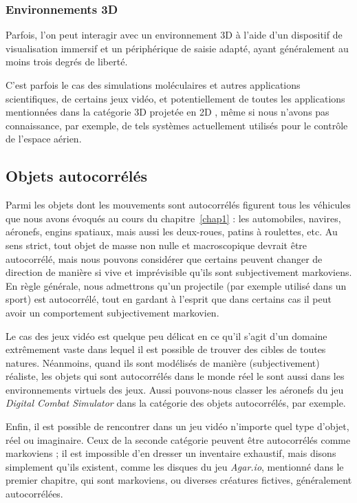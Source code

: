 	\subsubsection{Environnements 3D}
	Parfois, l'on peut interagir avec un environnement 3D à l'aide d'un dispositif de visualisation immersif et un périphérique de saisie adapté, ayant généralement au moins trois degrés de liberté.
	
	C'est parfois le cas des simulations moléculaires et autres applications scientifiques, de certains jeux vidéo, et potentiellement de toutes les applications mentionnées dans la catégorie \og 3D projetée en 2D \fg{}, même si nous n'avons pas connaissance, par exemple, de tels systèmes actuellement utilisés pour le contrôle de l'espace aérien.

	\subsection{Objets autocorrélés}
	Parmi les objets dont les mouvements sont autocorrélés figurent tous les véhicules que nous avons évoqués au cours du chapitre~\ref{chap1} : les automobiles, navires, aéronefs, engins spatiaux, mais aussi les deux-roues, patins à roulettes, etc. Au sens strict, tout objet de masse non nulle et macroscopique devrait être autocorrélé, mais nous pouvons considérer que certains peuvent changer de direction de manière si vive et imprévisible qu'ils sont subjectivement markoviens. En règle générale, nous admettrons qu'un projectile (par exemple utilisé dans un sport) est autocorrélé, tout en gardant à l'esprit que dans certains cas il peut avoir un comportement subjectivement markovien.
	
	Le cas des jeux vidéo est quelque peu délicat en ce qu'il s'agit d'un domaine extrêmement vaste dans lequel il est possible de trouver des cibles de toutes natures. Néanmoins, quand ils sont modélisés de manière (subjectivement) réaliste, les objets qui sont autocorrélés dans le monde réel le sont aussi dans les environnements virtuels des jeux. Aussi pouvons-nous classer les aéronefs du jeu \emph{Digital Combat Simulator}\footnotemark{} dans la catégorie des objets autocorrélés, par exemple.
	
	
	Enfin, il est possible de rencontrer dans un jeu vidéo n'importe quel type d'objet, réel ou imaginaire. Ceux de la seconde catégorie peuvent être autocorrélés comme markoviens ; il est impossible d'en dresser un inventaire exhaustif, mais disons simplement qu'ils existent, comme les disques du jeu \emph{Agar.io}, mentionné dans le premier chapitre, qui sont markoviens, ou diverses créatures fictives, généralement autocorrélées.
	
